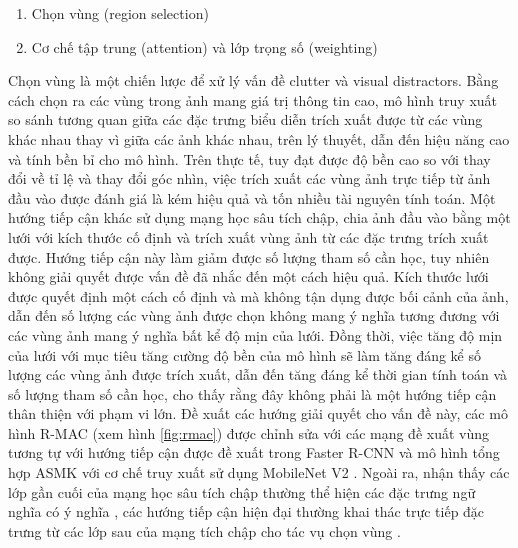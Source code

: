 \begin{enumerate}
    \item Chọn vùng (region selection)
    \item Cơ chế tập trung (attention) và lớp trọng số (weighting)
\end{enumerate}

Chọn vùng là một chiến lược để xử lý vấn đề clutter và visual distractors. Bằng cách chọn ra các vùng trong ảnh mang giá trị thông tin cao, mô hình truy xuất so sánh tương quan giữa các đặc trưng biểu diễn trích xuất được từ các vùng khác nhau thay vì giữa các ảnh khác nhau, trên lý thuyết, dẫn đến hiệu năng cao và tính bền bỉ cho mô hình. Trên thực tế, tuy đạt được độ bền cao so với thay đổi về tỉ lệ và thay đổi góc nhìn, việc trích xuất các vùng ảnh trực tiếp từ ảnh đầu vào được đánh giá là kém hiệu quả và tốn nhiều tài nguyên tính toán. Một hướng tiếp cận khác sử dụng mạng học sâu tích chập, chia ảnh đầu vào bằng một lưới với kích thước cố định và trích xuất vùng ảnh từ các đặc trưng trích xuất được\cite{razavian2016visual, tolias2015particular}. Hướng tiếp cận này làm giảm được số lượng tham số cần học, tuy nhiên không giải quyết được vấn đề đã nhắc đến một cách hiệu quả. Kích thước lưới được quyết định một cách cố định và mà không tận dụng được bối cảnh của ảnh, dẫn đến số lượng các vùng ảnh được chọn không mang ý nghĩa tương đương với các vùng ảnh mang ý nghĩa bất kể độ mịn của lưới. Đồng thời, việc tăng độ mịn của lưới với mục tiêu tăng cường độ bền của mô hình sẽ làm tăng đáng kể số lượng các vùng ảnh được trích xuất, dẫn đến tăng đáng kể thời gian tính toán và số lượng tham số cần học, cho thấy rằng đây không phải là một hướng tiếp cận thân thiện với phạm vi lớn. Đề xuất các hướng giải quyết cho vấn đề này, các mô hình R-MAC \cite{tolias2015particular} (xem hình \ref{fig:rmac}) được chỉnh sửa với các mạng đề xuất vùng tương tự với hướng tiếp cận được đề xuất trong Faster R-CNN \cite{ren2015faster} và mô hình tổng hợp ASMK \cite{selective-match-kernel} với cơ chế truy xuất sử dụng MobileNet V2 \cite{sandler2018mobilenetv2, teichmann2019detect}. Ngoài ra, nhận thấy các lớp gần cuối của mạng học sâu tích chập thường thể hiện các đặc trưng ngữ nghĩa có ý nghĩa \cite{ZeilerVisualizingAU}, các hướng tiếp cận hiện đại thường khai thác trực tiếp đặc trưng từ các lớp sau của mạng tích chập cho tác vụ chọn vùng \cite{chen2017only, khaliq2019holistic}.

